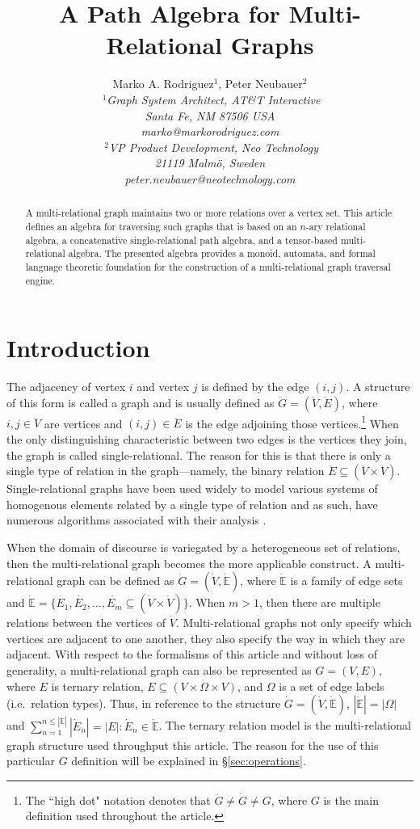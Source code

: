 \documentclass[10pt,conference,letterpaper]{IEEEtran}
\title{A Path Algebra for Multi-Relational Graphs}
\author{{Marko A. Rodriguez{\small $^1$}, Peter Neubauer{\small $^2$} }\vspace{1.6mm}\\
\fontsize{10}{10}\selectfont\itshape
$~^{1}$Graph System Architect, AT\&T Interactive\\
Santa Fe, NM 87506 USA\\
\fontsize{9}{9}\selectfont\ttfamily\upshape
marko@markorodriguez.com
\vspace{1.2mm}\\
\fontsize{10}{10}\selectfont\rmfamily\itshape
$~^{2}$VP Product Development, Neo Technology\\
21119 Malm\"{o}, Sweden\\
\fontsize{9}{9}\selectfont\ttfamily\upshape
peter.neubauer@neotechnology.com
}
\newcommand{\mbb}{\mathbb}
\begin{document}
\maketitle
\begin{abstract} 
A multi-relational graph maintains two or more relations over a vertex set. This article defines an algebra for traversing such graphs that is based on an $n$-ary relational algebra, a concatenative single-relational path algebra, and a tensor-based multi-relational algebra. The presented algebra provides a monoid, automata, and formal language theoretic foundation for the construction of a multi-relational graph traversal engine.
\end{abstract}

\section{Introduction}

The adjacency of vertex $i$ and vertex $j$ is defined by the edge $(i,j)$. A structure of this form is called a graph and is usually defined as $\ddot{G} = (\ddot{V},\ddot{E})$, where $i,j \in \ddot{V}$ are vertices and $(i,j) \in \ddot{E}$ is the edge adjoining those vertices.\footnote{The ``high dot" notation denotes that $\ddot{G} \neq \dot{G} \neq G$, where $G$ is the main definition used throughout the article.} When the only distinguishing characteristic between two edges is the vertices they join, the graph is called single-relational. The reason for this is that there is only a single type of relation in the graph---namely, the binary relation $\ddot{E} \subseteq (\ddot{V} \times \ddot{V})$. Single-relational graphs have been used widely to model various systems of homogenous elements related by a single type of relation and as such, have numerous algorithms associated with their analysis \cite{netanal:brandes2005}. 

When the domain of discourse is variegated by a heterogeneous set of relations, then the multi-relational graph becomes the more applicable construct. A multi-relational graph can be defined as $\dot{G} = (\dot{V}, \dot{\mbb{E}})$, where $\dot{\mbb{E}}$ is a family of edge sets and $\dot{\mbb{E}}= \{\dot{E_1}, \dot{E_2}, \ldots, \dot{E_m} \subseteq (\dot{V} \times \dot{V})\}$. When $m > 1$, then there are multiple relations between the vertices of $\dot{V}$. Multi-relational graphs not only specify which vertices are adjacent to one another, they also specify the way in which they are adjacent. With respect to the formalisms of this article and without loss of generality, a multi-relational graph can also be represented as $G = (V, E)$, where $E$ is ternary relation, $E \subseteq (V \times \Omega \times V)$, and $\Omega$ is a set of edge labels (i.e.~relation types). Thus, in reference to the structure $\dot{G} = (\dot{V}, \dot{\mbb{E}})$, $|\dot{\mbb{E}}| = |\Omega|$ and $\sum_{n=1}^{n \leq |\dot{\mbb{E}}|} |\dot{E}_n| = |E| : \dot{E}_n \in \dot{\mbb{E}}$. The ternary relation model is the multi-relational graph structure used throughput this article. The reason for the use of this particular $G$ definition will be explained in \S \ref{sec:operations}.
\end{document}
